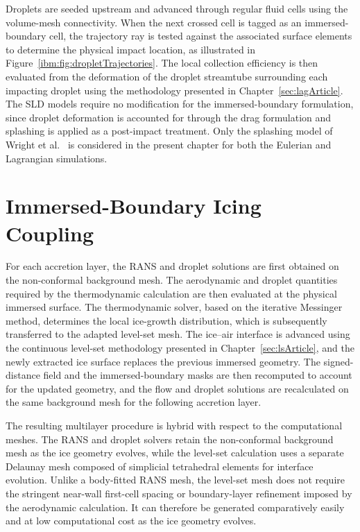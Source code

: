 Droplets are seeded upstream and advanced through regular fluid cells using the volume-mesh connectivity. When the next crossed cell is tagged as an immersed-boundary cell, the trajectory ray is tested against the associated surface elements to determine the physical impact location, as illustrated in Figure~\ref{ibm:fig:dropletTrajectories}. The local collection efficiency is then evaluated from the deformation of the droplet streamtube surrounding each impacting droplet using the methodology presented in Chapter~\ref{sec:lagArticle}. The SLD models require no modification for the immersed-boundary formulation, since droplet deformation is accounted for through the drag formulation and splashing is applied as a post-impact treatment. Only the splashing model of Wright et al.~\cite{wright2004semi} is considered in the present chapter for both the Eulerian and Lagrangian simulations.

\section{Immersed-Boundary Icing Coupling}
\label{ibm:sec:thermoGeo}

For each accretion layer, the RANS and droplet solutions are first obtained on the non-conformal background mesh. The aerodynamic and droplet quantities required by the thermodynamic calculation are then evaluated at the physical immersed surface. The thermodynamic solver, based on the iterative Messinger method, determines the local ice-growth distribution, which is subsequently transferred to the adapted level-set mesh. The ice--air interface is advanced using the continuous level-set methodology presented in Chapter~\ref{sec:lsArticle}, and the newly extracted ice surface replaces the previous immersed geometry. The signed-distance field and the immersed-boundary masks are then recomputed to account for the updated geometry, and the flow and droplet solutions are recalculated on the same background mesh for the following accretion layer.

The resulting multilayer procedure is hybrid with respect to the computational meshes. The RANS and droplet solvers retain the non-conformal background mesh as the ice geometry evolves, while the level-set calculation uses a separate Delaunay mesh composed of simplicial tetrahedral elements for interface evolution. Unlike a body-fitted RANS mesh, the level-set mesh does not require the stringent near-wall first-cell spacing or boundary-layer refinement imposed by the aerodynamic calculation. It can therefore be generated comparatively easily and at low computational cost as the ice geometry evolves.

